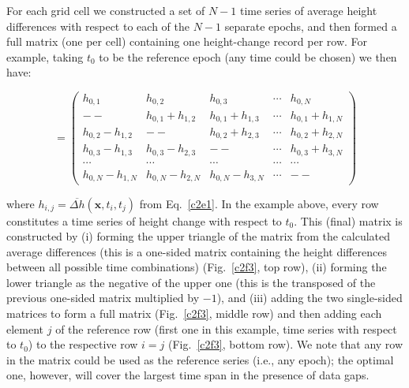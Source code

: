 For each grid cell we constructed a set of $N-1$ time series of average height differences with respect to each of the $N-1$ separate epochs, and then formed a full matrix (one per cell) containing one height-change record per row. For example, taking $t_0$ to be the reference epoch (any time could be chosen) we then have:

\begin{equation}
  [\Delta h] = 
  \begin{pmatrix}
    h_{0,1} & h_{0,2} & h_{0,3} & \cdots & h_{0,N} \\
    -- & h_{0,1} + h_{1,2} & h_{0,1} + h_{1,3} & \cdots & h_{0,1} + h_{1,N} \\
    h_{0,2} - h_{1,2} & -- & h_{0,2} + h_{2,3} & \cdots & h_{0,2} + h_{2,N} \\
    h_{0,3} - h_{1,3} & h_{0,3} - h_{2,3} & -- & \cdots & h_{0,3} + h_{3,N} \\
    \cdots & \cdots & \cdots & \cdots & \cdots \\
    h_{0,N} - h_{1,N} & h_{0,N} - h_{2,N} & h_{0,N} - h_{3,N} & \cdots & --
  \end{pmatrix}
  \label{c2e2}
\end{equation}

\noindent
where $h_{i,j} = \overbar{\Delta h}(\mathbf{x}, t_i, t_j)$ from Eq.~\ref{c2e1}. In the example above, every row constitutes a time series of height change with respect to $t_0$. This (final) matrix is constructed by (i) forming the upper triangle of the matrix from the calculated average differences (this is a one-sided matrix containing the height differences between all possible time combinations) (Fig.~\ref{c2f3}, top row), (ii) forming the lower triangle as the negative of the upper one (this is the transposed of the previous one-sided matrix multiplied by $-1$), and (iii) adding the two single-sided matrices to form a full matrix (Fig.~\ref{c2f3}, middle row) and then adding each element $j$ of the reference row (first one in this example, time series with respect to $t_0$) to the respective row $i = j$ (Fig.~\ref{c2f3}, bottom row). We note that any row in the matrix could be used as the reference series (i.e., any epoch); the optimal one, however, will cover the largest time span in the presence of data gaps.


